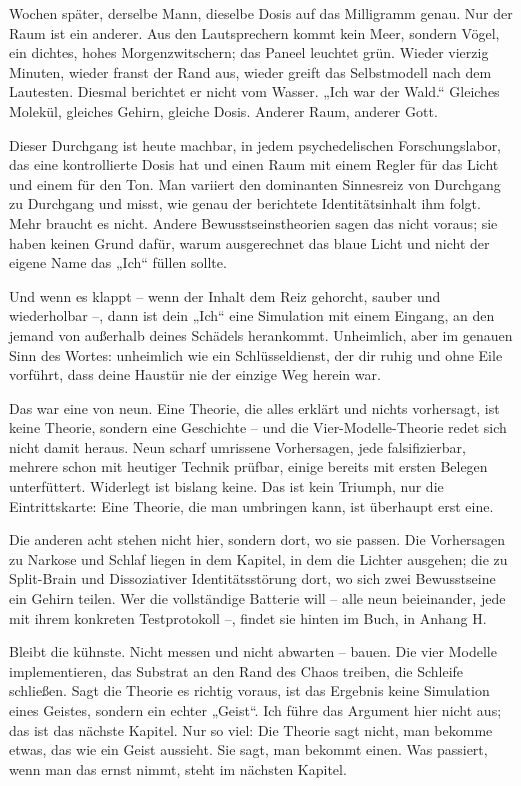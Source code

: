 \documentclass[11pt, twoside, openright]{book}
\begin{document}
Wochen später, derselbe Mann, dieselbe Dosis auf das Milligramm genau. Nur der Raum ist ein anderer. Aus den Lautsprechern kommt kein Meer, sondern Vögel, ein dichtes, hohes Morgenzwitschern; das Paneel leuchtet grün. Wieder vierzig Minuten, wieder franst der Rand aus, wieder greift das Selbstmodell nach dem Lautesten. Diesmal berichtet er nicht vom Wasser. „Ich war der Wald.“ Gleiches Molekül, gleiches Gehirn, gleiche Dosis. Anderer Raum, anderer Gott.

Dieser Durchgang ist heute machbar, in jedem psychedelischen Forschungslabor, das eine kontrollierte Dosis hat und einen Raum mit einem Regler für das Licht und einem für den Ton. Man variiert den dominanten Sinnesreiz von Durchgang zu Durchgang und misst, wie genau der berichtete Identitätsinhalt ihm folgt. Mehr braucht es nicht. Andere Bewusstseinstheorien sagen das nicht voraus; sie haben keinen Grund dafür, warum ausgerechnet das blaue Licht und nicht der eigene Name das „Ich“ füllen sollte.

Und wenn es klappt -- wenn der Inhalt dem Reiz gehorcht, sauber und wiederholbar --, dann ist dein „Ich“ eine Simulation mit einem Eingang, an den jemand von außerhalb deines Schädels herankommt. Unheimlich, aber im genauen Sinn des Wortes: unheimlich wie ein Schlüsseldienst, der dir ruhig und ohne Eile vorführt, dass deine Haustür nie der einzige Weg herein war.

Das war eine von neun. Eine Theorie, die alles erklärt und nichts vorhersagt, ist keine Theorie, sondern eine Geschichte -- und die Vier-Modelle-Theorie redet sich nicht damit heraus. Neun scharf umrissene Vorhersagen, jede falsifizierbar, mehrere schon mit heutiger Technik prüfbar, einige bereits mit ersten Belegen unterfüttert. Widerlegt ist bislang keine. Das ist kein Triumph, nur die Eintrittskarte: Eine Theorie, die man umbringen kann, ist überhaupt erst eine.

Die anderen acht stehen nicht hier, sondern dort, wo sie passen. Die Vorhersagen zu Narkose und Schlaf liegen in dem Kapitel, in dem die Lichter ausgehen; die zu Split-Brain und Dissoziativer Identitätsstörung dort, wo sich zwei Bewusstseine ein Gehirn teilen. Wer die vollständige Batterie will -- alle neun beieinander, jede mit ihrem konkreten Testprotokoll --, findet sie hinten im Buch, in Anhang H.

Bleibt die kühnste. Nicht messen und nicht abwarten -- bauen. Die vier Modelle implementieren, das Substrat an den Rand des Chaos treiben, die Schleife schließen. Sagt die Theorie es richtig voraus, ist das Ergebnis keine Simulation eines Geistes, sondern ein echter „Geist“. Ich führe das Argument hier nicht aus; das ist das nächste Kapitel. Nur so viel: Die Theorie sagt nicht, man bekomme etwas, das wie ein Geist aussieht. Sie sagt, man bekommt einen. Was passiert, wenn man das ernst nimmt, steht im nächsten Kapitel.
\end{document}
